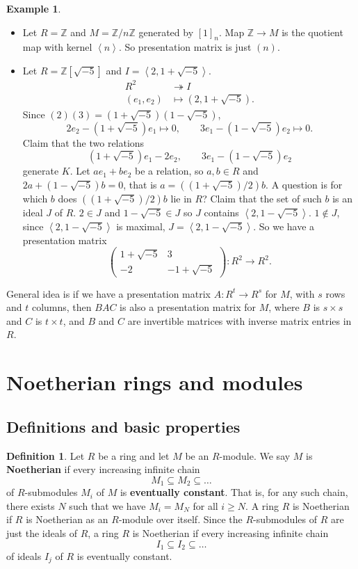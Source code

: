 \documentclass{article}
\newcommand{\Z}{\mathbb{Z}}
\newcommand{\rb}[1]{\left( #1 \right)}
\renewcommand{\sb}[1]{\left[ #1 \right]}
\newcommand{\ab}[1]{\left\langle #1 \right\rangle}
\newcommand{\two}[2]{\begin{pmatrix} #1 \\ #2 \end{pmatrix}}
\theoremstyle{definition}\newtheorem{definition}{Definition}[subsection]
\theoremstyle{definition}\newtheorem{remark}[definition]{Remark}
\theoremstyle{definition}\newtheorem*{example}{Example}
\theoremstyle{definition}\newtheorem*{note}{Note}
\begin{document}
\begin{example}
\hfill
\begin{itemize}
\item Let $ R = \Z $ and $ M = \Z / n\Z $ generated by $ \sb{1}_n $. Map $ \Z \to M $ is the quotient map with kernel $ \ab{n} $. So presentation matrix is just $ \rb{n} $.
\item Let $ R = \Z\sb{\sqrt{-5}} $ and $ I = \ab{2, 1 + \sqrt{-5}} $.
\begin{align*}
R^2 & \twoheadrightarrow I \\
\rb{e_1, e_2} & \mapsto \rb{2, 1 + \sqrt{-5}}.
\end{align*}
Since $ \rb{2}\rb{3} = \rb{1 + \sqrt{-5}}\rb{1 - \sqrt{-5}} $,
$$ 2e_2 - \rb{1 + \sqrt{-5}}e_1 \mapsto 0, \qquad 3e_1 - \rb{1 - \sqrt{-5}}e_2 \mapsto 0. $$
Claim that the two relations
$$ \rb{1 + \sqrt{-5}}e_1 - 2e_2, \qquad 3e_1 - \rb{1 - \sqrt{-5}}e_2 $$
generate $ K $. Let $ ae_1 + be_2 $ be a relation, so $ a, b \in R $ and $ 2a + \rb{1 - \sqrt{-5}}b = 0 $, that is $ a = \rb{\rb{1 + \sqrt{-5}} / 2}b $. A question is for which $ b $ does $ \rb{\rb{1 + \sqrt{-5}} / 2}b $ lie in $ R $? Claim that the set of such $ b $ is an ideal $ J $ of $ R $. $ 2 \in J $ and $ 1 - \sqrt{-5} \in J $ so $ J $ contains $ \ab{2, 1 - \sqrt{-5}} $. $ 1 \notin J $, since $ \ab{2, 1 - \sqrt{-5}} $ is maximal, $ J = \ab{2, 1 - \sqrt{-5}} $. So we have a presentation matrix
$$ \two{1 + \sqrt{-5} & 3}{-2 & -1 + \sqrt{-5}} : R^2 \to R^2. $$
\end{itemize}
\end{example}

General idea is if we have a presentation matrix $ A : R^t \to R^s $ for $ M $, with $ s $ rows and $ t $ columns, then $ BAC $ is also a presentation matrix for $ M $, where $ B $ is $ s \times s $ and $ C $ is $ t \times t $, and $ B $ and $ C $ are invertible matrices with inverse matrix entries in $ R $.

\pagebreak

\section{Noetherian rings and modules}

\subsection{Definitions and basic properties}

\begin{definition}
Let $ R $ be a ring and let $ M $ be an $ R $-module. We say $ M $ is \textbf{Noetherian} if every increasing infinite chain
$$ M_1 \subseteq M_2 \subseteq \dots $$
of $ R $-submodules $ M_i $ of $ M $ is \textbf{eventually constant}. That is, for any such chain, there exists $ N $ such that we have $ M_i = M_N $ for all $ i \ge N $. A ring $ R $ is Noetherian if $ R $ is Noetherian as an $ R $-module over itself. Since the $ R $-submodules of $ R $ are just the ideals of $ R $, a ring $ R $ is Noetherian if every increasing infinite chain
$$ I_1 \subseteq I_2 \subseteq \dots $$
of ideals $ I_j $ of $ R $ is eventually constant.
\end{definition}
\end{document}
